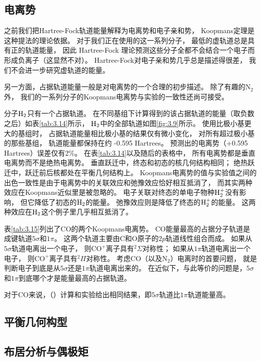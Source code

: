 \subsection{电离势}
之前我们把Hartree-Fock轨道能量解释为电离势和电子亲和势，
Koopmans定理是这种提法的理论依据。 
对于我们正在使用的这一系列分子，
最低的虚轨道总是具有正的轨道能量，
因此 Hartree-Fock 理论预测这些分子全都不会结合一个电子而形成负离子（这显然不对）。 
Hartree-Fock对电子亲和势几乎总是描述得很差，
我们不会进一步研究虚轨道的能量。

另一方面，占据轨道能量一般是对电离势的一个合理的初步描述。
除了有趣的$\mathrm{N_2}$外，
我们的一系列分子的Koopmans电离势与实验的一致性还尚可接受。

分子$\mathrm{H}_2$只有一个占据轨道。
在不同基组下计算得到的该占据轨道的能量（取负数之后）如表\autoref{tab:3.14}所示，
$\mathrm{H}_2$中的全部轨道如图\autoref{fig:3.9}所示。
使用比极小基更大的基组时，
占据轨道能量相比极小基的结果仅有微小变化，
对所有超过极小基的那些基组，
轨道能量都保持在约 -0.595 Hartrees。
预测出的电离势（+0.595 Hartrees）误差仅有2\%。
在表\autoref{tab:3.14}以及随后的表格中，
所有电离势都是垂直电离势而不是绝热电离势。
垂直跃迁中，终态和初态的核几何结构相同；
绝热跃迁中，跃迁前后核都处在平衡几何结构上。
Koopmans电离势的值与实验值之间的出色一致性是由于电离势中的关联效应和弛豫效应恰好相互抵消了，
而其实两种效应在Koopmans近似里是被忽略的。
电子关联对终态的单电子物种$\mathrm{H}_2^+$没有影响，
但它降低了初态的$\mathrm{H}_2$的能量。
弛豫效应则是降低了终态的$\mathrm{H}_2^+$的能量。
这两种效应在$\mathrm{H}_2$这个例子里几乎相互抵消了。

表\autoref{tab:3.15}列出了$\mathrm{CO}$的两个Koopmans电离势。
$\mathrm{CO}$能量最高的占据分子轨道是成键轨道$5\sigma$和$1\pi$。
这两个轨道主要由C和O原子的$2p$轨道线性组合而成。
如果从$5\sigma$轨道电离出一个电子，
则$\mathrm{CO}^+$离子具有$\mbox{}^2\Sigma$对称性；
如果从$1\pi$轨道电离出一个电子，
则$\mathrm{CO}^+$离子具有$\mbox{}^2\Pi$对称性。
考虑$\mathrm{CO}$（以及$\mathrm{N}_2$）电离时的首要问题，
就是判断电子到底是从$5\sigma$还是$1\pi$轨道电离出来的。
在\hft 近似下，与此等价的问题是，$5\sigma$和$1\pi$到底哪个才是能量最高的占据轨道。

对于$\mathrm{CO}$来说，（\hft）计算和实验给出相同结果，即$5\sigma$轨道比$1\pi$轨道能量高。


\subsection{平衡几何构型}
\subsection{布居分析与偶极矩}

